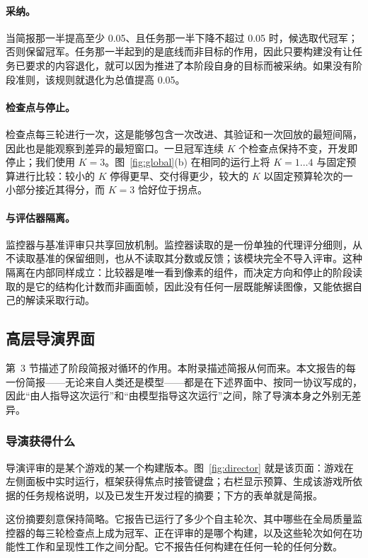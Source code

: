 \paragraph{采纳。}当简报那一半提高至少 0.05、且任务那一半下降不超过 0.05 时，候选取代冠军；否则保留冠军。任务那一半起到的是底线而非目标的作用，因此只要构建没有让任务已要求的内容退化，就可以因为推进了本阶段自身的目标而被采纳。如果没有阶段准则，该规则就退化为总值提高 0.05。

\paragraph{检查点与停止。}检查点每三轮进行一次，这是能够包含一次改进、其验证和一次回放的最短间隔，因此也是能观察到差异的最短窗口。一旦冠军连续 $K$ 个检查点保持不变，开发即停止；我们使用 $K = 3$。图~\ref{fig:global}(b) 在相同的运行上将 $K = 1 \ldots 4$ 与固定预算进行比较：较小的 $K$ 停得更早、交付得更少，较大的 $K$ 以固定预算轮次的一小部分接近其得分，而 $K = 3$ 恰好位于拐点。

\paragraph{与评估器隔离。}监控器与基准评审只共享回放机制。监控器读取的是一份单独的代理评分细则，从不读取基准的保留细则，也从不读取其分数或反馈；该模块完全不导入评审。这种隔离在内部同样成立：比较器是唯一看到像素的组件，而决定方向和停止的阶段读取的是它的结构化计数而非画面帧，因此没有任何一层既能解读图像，又能依据自己的解读采取行动。

\subsection{高层导演界面}\label{app:director}
第~3 节描述了阶段简报对循环的作用。本附录描述简报从何而来。本文报告的每一份简报——无论来自人类还是模型——都是在下述界面中、按同一协议写成的，因此“由人指导这次运行”和“由模型指导这次运行”之间，除了导演本身之外别无差异。

\subsubsection{导演获得什么}
导演评审的是某个游戏的某一个构建版本。图~\ref{fig:director} 就是该页面：游戏在左侧面板中实时运行，框架获得焦点时接管键盘；右栏显示预算、生成该游戏所依据的任务规格说明，以及已发生开发过程的摘要；下方的表单就是简报。

这份摘要刻意保持简略。它报告已运行了多少个自主轮次、其中哪些在全局质量监控器的每三轮检查点上成为冠军、正在评审的是哪个构建，以及这些轮次如何在功能性工作和呈现性工作之间分配。它不报告任何构建在任何一轮的任何分数。

